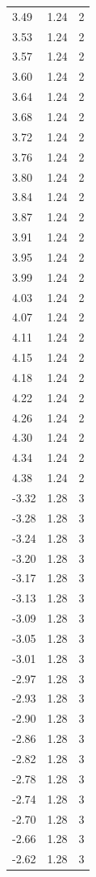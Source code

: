 \begin{longtable}{lrr}
  3.49 & 1.24 & 2 \\
  3.53 & 1.24 & 2 \\
  3.57 & 1.24 & 2 \\
  3.60 & 1.24 & 2 \\
  3.64 & 1.24 & 2 \\
  3.68 & 1.24 & 2 \\
  3.72 & 1.24 & 2 \\
  3.76 & 1.24 & 2 \\
  3.80 & 1.24 & 2 \\
  3.84 & 1.24 & 2 \\
  3.87 & 1.24 & 2 \\
  3.91 & 1.24 & 2 \\
  3.95 & 1.24 & 2 \\
  3.99 & 1.24 & 2 \\
  4.03 & 1.24 & 2 \\
  4.07 & 1.24 & 2 \\
  4.11 & 1.24 & 2 \\
  4.15 & 1.24 & 2 \\
  4.18 & 1.24 & 2 \\
  4.22 & 1.24 & 2 \\
  4.26 & 1.24 & 2 \\
  4.30 & 1.24 & 2 \\
  4.34 & 1.24 & 2 \\
  4.38 & 1.24 & 2 \\
  -3.32 & 1.28 & 3 \\
  -3.28 & 1.28 & 3 \\
  -3.24 & 1.28 & 3 \\
  -3.20 & 1.28 & 3 \\
  -3.17 & 1.28 & 3 \\
  -3.13 & 1.28 & 3 \\
  -3.09 & 1.28 & 3 \\
  -3.05 & 1.28 & 3 \\
  -3.01 & 1.28 & 3 \\
  -2.97 & 1.28 & 3 \\
  -2.93 & 1.28 & 3 \\
  -2.90 & 1.28 & 3 \\
  -2.86 & 1.28 & 3 \\
  -2.82 & 1.28 & 3 \\
  -2.78 & 1.28 & 3 \\
  -2.74 & 1.28 & 3 \\
  -2.70 & 1.28 & 3 \\
  -2.66 & 1.28 & 3 \\
  -2.62 & 1.28 & 3 \\

\end{longtable}

